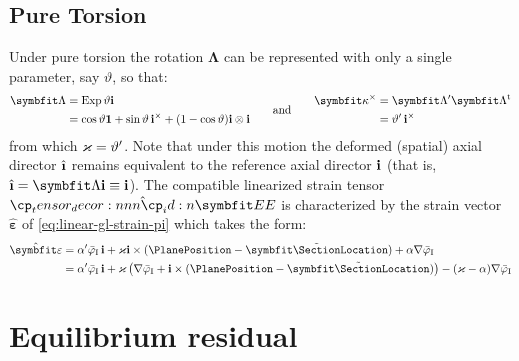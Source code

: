 \subsection{Pure Torsion}
Under pure torsion the rotation \(\bm{\Lambda}\)
can be represented with only a single parameter, say \(\vartheta\), so that:
\begin{equation}
\begin{aligned}
\bm{\Lambda} &= \operatorname{Exp} \vartheta \FrameBasis \\
&=\cos \vartheta \mathbf{1} + \sin \vartheta \, \FrameBasis^{\times} + (1-\cos \vartheta)  \FrameBasis \otimes \FrameBasis
\end{aligned}
\qquad\text{and}\qquad 
\begin{aligned}
\bm{\kappa}^{\times} &= \bm{\Lambda}^{\prime}\bm{\Lambda}^{\mathrm{t}} \\
&= \vartheta^{\prime} \, \FrameBasis^{\times}
\end{aligned}
\label{eq:rotation-field}
\end{equation}
from which \(\varkappa = \vartheta'\). 
Note that under this motion the deformed (spatial) axial director \(\frameBasis\) remains equivalent to the reference axial director \(\mathbf{i}\) (that is, \(\frameBasis = \FrameRotation \FrameBasis \equiv \FrameBasis\)). 
The compatible linearized strain tensor \(\hat{\StrainTensor}\) is characterized by the strain vector \(\hat{\bm{\varepsilon}}\) of \eqref{eq:linear-gl-strain-pi} which takes the form:
%
\begin{equation}
\begin{aligned}
\hat{\bm{\varepsilon}} 
&= \alpha' \WarpTwistIesan\,\FrameBasis + \Twist \FrameBasis \times (\PlanePosition-\tilde{\bm{\SectionLocation}}) + \alpha \nabla  \WarpTwistIesan \\
&= \alpha' \WarpTwistIesan\,\FrameBasis +  \Twist \, \bigl(\nabla \WarpTwistIesan + \FrameBasis\times(\PlanePosition - \tilde{\bm{\SectionLocation}})\bigr) - (\Twist - \alpha) \nabla \WarpTwistIesan
\end{aligned}
\label{eq:torsion-strain}
\end{equation}



\iftrue
\section{Equilibrium residual}
\label{sec:nonuniform-residual}


